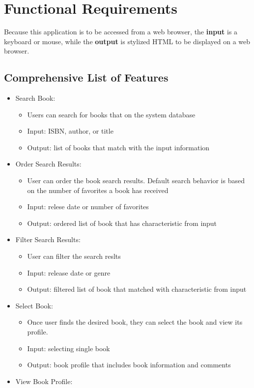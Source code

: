\documentclass[letter, 12pt, titlepage]{article}
\begin{document}
\section{Functional Requirements}
		Because this application is to be accessed from a web browser, the \textbf{input} is a keyboard or mouse, while the \textbf{output} is stylized HTML to be displayed on a web browser. 

	\subsection{Comprehensive List of Features}
	\begin{itemize}

	\item	Search Book:
		\begin{itemize}
			\item  Users can search for books that on the system database
			\item  Input: ISBN, author, or title
			\item  Output: list of books that match with the input information
		\end{itemize}
	\item	Order Search Results:
		\begin{itemize}
			\item  User can order the book search results. Default search behavior is based on the number of favorites a book has received
			\item  Input: relese date or number of favorites
			\item  Output: ordered list of book that has characteristic from input
		\end{itemize}
	\item	Filter Search Results:
		\begin{itemize}
			\item  User can filter the search reslts 
			\item  Input: release date or genre
			\item  Output: filtered list of book that matched with characteristic from input
		\end{itemize}
	\item	Select Book:
		\begin{itemize}
			\item  Once user finds the desired book, they can select the book and view its profile.
			\item  Input: selecting single book
			\item  Output: book profile that includes book information and comments
		\end{itemize}
	\item	View Book Profile:


\end{itemize}
\end{document}
